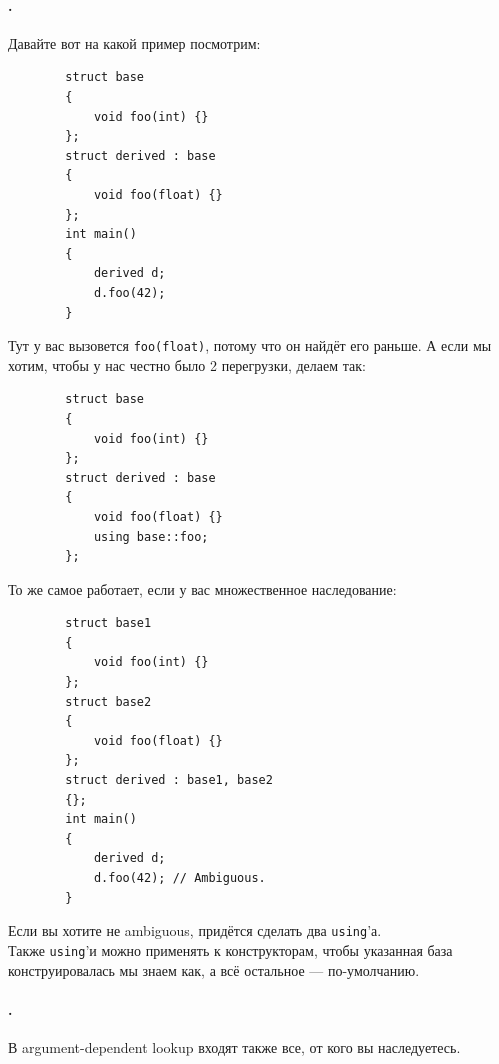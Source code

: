 \documentclass{article}
\begin{document}
    \paragraph{.}
    Давайте вот на какой пример посмотрим:
    \begin{verbatim}
        struct base
        {
            void foo(int) {}
        };
        struct derived : base
        {
            void foo(float) {}
        };
        int main()
        {
            derived d;
            d.foo(42);
        }
    \end{verbatim}
    Тут у вас вызовется \texttt{foo(float)}, потому что он найдёт его раньше. А если мы хотим, чтобы у нас честно было 2 перегрузки, делаем так:
    \begin{verbatim}
        struct base
        {
            void foo(int) {}
        };
        struct derived : base
        {
            void foo(float) {}
            using base::foo;
        };
    \end{verbatim}
    То же самое работает, если у вас множественное наследование:
    \begin{verbatim}
        struct base1
        {
            void foo(int) {}
        };
        struct base2
        {
            void foo(float) {}
        };
        struct derived : base1, base2
        {};
        int main()
        {
            derived d;
            d.foo(42); // Ambiguous.
        }
    \end{verbatim}
    Если вы хотите не ambiguous, придётся сделать два \texttt{using}'а.\\
    Также \texttt{using}'и можно применять к конструкторам, чтобы указанная база конструировалась мы знаем как, а всё остальное --- по-умолчанию.
    \paragraph{.}
    В argument-dependent lookup входят также все, от кого вы наследуетесь.
\end{document}
